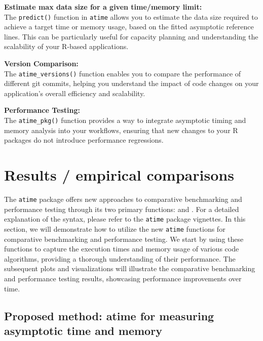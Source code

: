 \textbf{Estimate max data size for a given time/memory limit:} \\
The \texttt{predict()} function in \texttt{atime} allows you to estimate the data size required to achieve a target time or memory usage, based on the fitted asymptotic reference lines. This can be particularly useful for capacity planning and understanding the scalability of your R-based applications.
\vspace{0.1in}

\textbf{Version Comparison:} \\
The \texttt{atime\_versions()} function enables you to compare the performance of different git commits, helping you understand the impact of code changes on your application's overall efficiency and scalability.
\vspace{0.1in}

\textbf{Performance Testing:} \\
The \texttt{atime\_pkg()} function provides a way to integrate asymptotic timing and memory analysis into your workflows, ensuring that new changes to your R packages do not introduce performance regressions.
\vspace{0.1in}

\section{Results / empirical comparisons}

\noindent The \texttt{atime} package offers new approaches to comparative benchmarking and performance testing through its two primary functions:  and . For a detailed explanation of the syntax, please refer to the \texttt{atime} package vignettes. In this section, we will demonstrate how to utilize the new \texttt{atime} functions for comparative benchmarking and performance testing. We start by using these functions to capture the execution times and memory usage of various code algorithms, providing a thorough understanding of their performance. The subsequent plots and visualizations will illustrate the comparative benchmarking and performance testing results, showcasing performance improvements over time.\\

\subsection{Proposed method: atime for measuring asymptotic time and memory}

